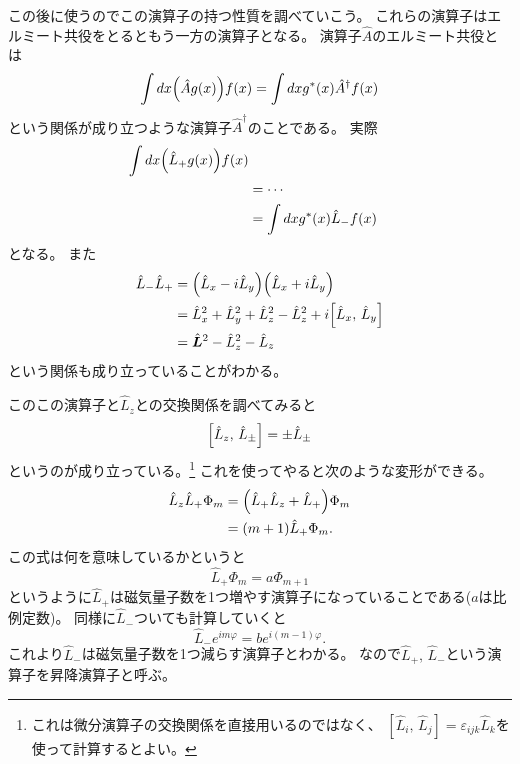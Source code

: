 \documentclass[../../master.tex]{subfiles}
\begin{document}
この後に使うのでこの演算子の持つ性質を調べていこう。
これらの演算子はエルミート共役をとるともう一方の演算子となる。
演算子\(\hat{A}\)のエルミート共役とは
\begin{equation}
	\int dx \qty(\hat{A}g(x)) f(x) = \int dx g^*(x) \hat{A}^\dag f(x)
\end{equation}
という関係が成り立つような演算子\(\hat{A}^\dag\)のことである。
実際
\begin{align}
	\int dx \qty(\hat{L}_+ g(x))f(x)\\
	&= \cdots\\
	&=\int dx g^*(x) \hat{L}_- f(x)
\end{align}
となる。 %
また
\begin{align}
	\hat{L}_- \hat{L}_+ &= \qty(\hat{L}_x - i \hat{L}_y)\qty(\hat{L}_x + i\hat{L}_y)\\
	&=\hat{L}_x^2+\hat{L}_y^2 + \hat{L}_z^2 - \hat{L}_z^2 + i\qty[\hat{L}_x,\,\hat{L}_y] \\
	&=\hat{\vb*{L}}^2 -\hat{L}_z^2 -\hat{L}_z
\end{align}
という関係も成り立っていることがわかる。

このこの演算子と\(\hat{L}_z\)との交換関係を調べてみると
\begin{equation}
	\qty[\hat{L}_z,\,\hat{L}_\pm] = \pm \hat{L}_\pm
\end{equation}
というのが成り立っている。\footnote{これは微分演算子の交換関係を直接用いるのではなく、
\([\hat{L}_i,\,\hat{L}_j]=\varepsilon_{ijk}\hat{L}_k\)を使って計算するとよい。}
これを使ってやると次のような変形ができる。
\begin{align}
	\hat{L}_z\hat{L}_+ \Phi_m
	&= \qty(\hat{L}_+\hat{L}_z + \hat{L}_+)\Phi_m\\
	&= (m+1)\hat{L}_+\Phi_m.
\end{align}
この式は何を意味しているかというと
\begin{equation}
	\hat{L}_+ \Phi_m = a \Phi_{m+1}
\end{equation}
というように\(\hat{L}_+\)は磁気量子数を1つ増やす演算子になっていることである(\(a\)は比例定数)。
同様に\(\hat{L}_-\)ついても計算していくと
\begin{equation}
	\hat{L}_- e^{im\varphi} =b e^{i(m-1)\varphi}.
\end{equation}
これより\(\hat{L}_-\)は磁気量子数を1つ減らす演算子とわかる。
なので\(\hat{L}_+,\,\hat{L}_-\)という演算子を昇降演算子と呼ぶ。
\end{document}
